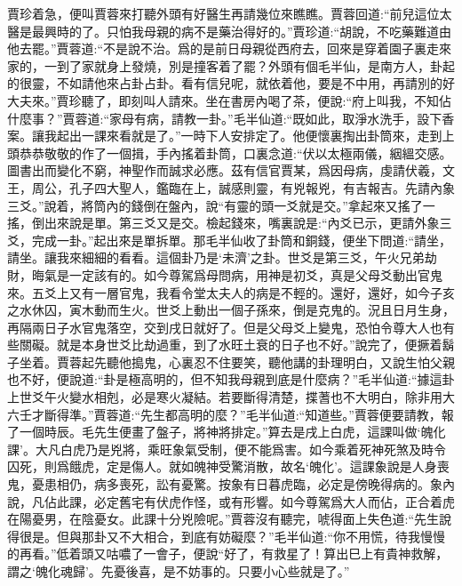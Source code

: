 \begin{parag}
    賈珍着急，便叫賈蓉來打聽外頭有好醫生再請幾位來瞧瞧。賈蓉回道:“前兒這位太醫是最興時的了。只怕我母親的病不是藥治得好的。”賈珍道:“胡說，不吃藥難道由他去罷。”賈蓉道:“不是說不治。爲的是前日母親從西府去，回來是穿着園子裏走來家的，一到了家就身上發燒，別是撞客着了罷？外頭有個毛半仙，是南方人，卦起的很靈，不如請他來占卦占卦。看有信兒呢，就依着他，要是不中用，再請別的好大夫來。”賈珍聽了，即刻叫人請來。坐在書房內喝了茶，便說:“府上叫我，不知佔什麼事？”賈蓉道:“家母有病，請教一卦。”毛半仙道:“既如此，取淨水洗手，設下香案。讓我起出一課來看就是了。”一時下人安排定了。他便懷裏掏出卦筒來，走到上頭恭恭敬敬的作了一個揖，手內搖着卦筒，口裏念道:“伏以太極兩儀，絪縕交感。圖書出而變化不窮，神聖作而誠求必應。茲有信官賈某，爲因母病，虔請伏羲，文王，周公，孔子四大聖人，鑑臨在上，誠感則靈，有兇報兇，有吉報吉。先請內象三爻。”說着，將筒內的錢倒在盤內，說“有靈的頭一爻就是交。”拿起來又搖了一搖，倒出來說是單。第三爻又是交。檢起錢來，嘴裏說是:“內爻已示，更請外象三爻，完成一卦。”起出來是單拆單。那毛半仙收了卦筒和銅錢，便坐下問道:“請坐，請坐。讓我來細細的看看。這個卦乃是‘未濟’之卦。世爻是第三爻，午火兄弟劫財，晦氣是一定該有的。如今尊駕爲母問病，用神是初爻，真是父母爻動出官鬼來。五爻上又有一層官鬼，我看令堂太夫人的病是不輕的。還好，還好，如今子亥之水休囚，寅木動而生火。世爻上動出一個子孫來，倒是克鬼的。況且日月生身，再隔兩日子水官鬼落空，交到戌日就好了。但是父母爻上變鬼，恐怕令尊大人也有些關礙。就是本身世爻比劫過重，到了水旺土衰的日子也不好。”說完了，便撅着鬍子坐着。賈蓉起先聽他搗鬼，心裏忍不住要笑，聽他講的卦理明白，又說生怕父親也不好，便說道:“卦是極高明的，但不知我母親到底是什麼病？”毛半仙道:“據這卦上世爻午火變水相剋，必是寒火凝結。若要斷得清楚，揲蓍也不大明白，除非用大六壬才斷得準。”賈蓉道:“先生都高明的麼？”毛半仙道:“知道些。”賈蓉便要請教，報了一個時辰。毛先生便畫了盤子，將神將排定。”算去是戌上白虎，這課叫做‘魄化課’。大凡白虎乃是兇將，乘旺象氣受制，便不能爲害。如今乘着死神死煞及時令囚死，則爲餓虎，定是傷人。就如魄神受驚消散，故名‘魄化’。這課象說是人身喪鬼，憂患相仍，病多喪死，訟有憂驚。按象有日暮虎臨，必定是傍晚得病的。象內說，凡佔此課，必定舊宅有伏虎作怪，或有形響。如今尊駕爲大人而佔，正合着虎在陽憂男，在陰憂女。此課十分兇險呢。”賈蓉沒有聽完，唬得面上失色道:“先生說得很是。但與那卦又不大相合，到底有妨礙麼？”毛半仙道:“你不用慌，待我慢慢的再看。”低着頭又咕噥了一會子，便說“好了，有救星了！算出巳上有貴神救解，謂之‘魄化魂歸’。先憂後喜，是不妨事的。只要小心些就是了。”
\end{parag}


